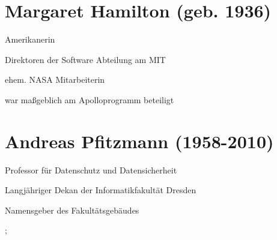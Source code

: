 \documentclass[a4paper,12pt]{report}
\begin{document}


\section*{Margaret Hamilton (geb. 1936)}
\begin{itemize*}
    \item Amerikanerin
    \item Direktoren der Software Abteilung am MIT
    \item ehem. NASA Mitarbeiterin
    \item war maßgeblich am Apolloprogramm beteiligt
\end{itemize*}

\section*{Andreas Pfitzmann (1958-2010)}
\begin{itemize*}
    \item Professor für Datenschutz und Datensicherheit
    \item Langjähriger Dekan der Informatikfakultät Dresden
    \item Namensgeber des Fakultätsgebäudes
\end{itemize*}

\pagebreak
    
    ;
\end{document}

